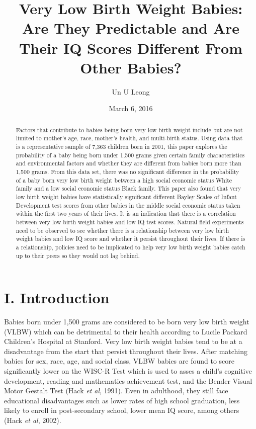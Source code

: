 \documentclass{article}
\title{Very Low Birth Weight Babies: Are They Predictable and Are Their IQ Scores Different From Other Babies?}
\author{Un U Leong}
\date{March 6, 2016}
\begin{document}
\maketitle


\begin{abstract}

Factors that contribute to babies being born very low birth weight include but are not limited to mother's age, race, mother's health, and multi-birth status. Using data that is a representative sample of 7,363 children born in 2001, this paper explores the probability of a baby being born under 1,500 grams given certain family characteristics and environmental factors and whether they are different from babies born more than 1,500 grams. From this data set, there was no significant difference in the probability of a baby born very low birth weight between a high social economic status White family and a low social economic status Black family. This paper also found that very low birth weight babies have statistically significant different Bayley Scales of Infant Development test scores from other babies in the middle social economic status taken within the first two years of their lives. It is an indication that there is a correlation between very low birth weight babies and low IQ test scores. Natural field experiments need to be observed to see whether there is a relationship between very low birth weight babies and low IQ score and whether it persist throughout their lives. If there is a relationship, policies need to be implicated to help very low birth weight babies catch up to their peers so they would not lag behind. 



\end{abstract}



\section*{I. Introduction}

Babies born under 1,500 grams are considered to be born very low birth weight (VLBW) which can be detrimental to their health according to Lucile Packard Children's Hospital at Stanford. Very low birth weight babies tend to be at a disadvantage from the start that persist throughout their lives. After matching babies for sex, race, age, and social class, VLBW babies are found to score significantly lower on the WISC-R Test which is used to asses a child's cognitive development, reading and mathematics achievement test, and the Bender Visual Motor Gestalt Test (Hack \textit{et al}, 1991). Even in adulthood, they still face educational disadvantages such as lower rates of high school graduation, less likely to enroll in post-secondary school, lower mean IQ score, among others (Hack \textit{et al}, 2002). 
\end{document}
